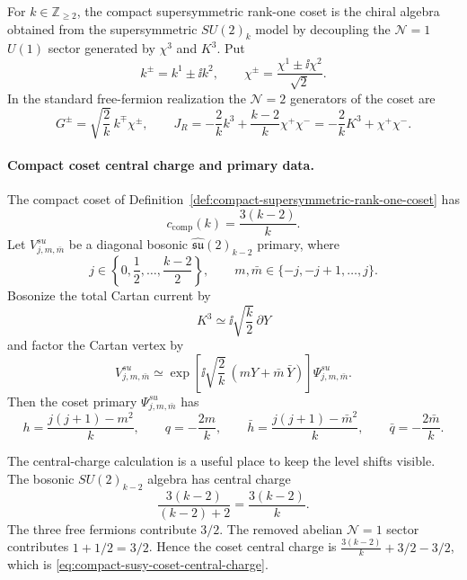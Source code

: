 \begin{definition}
\label{def:compact-supersymmetric-rank-one-coset}
For \(k\in\mathbb Z_{\ge2}\), the compact supersymmetric rank-one coset is
the chiral algebra obtained from the supersymmetric \(SU(2)_k\) model by
decoupling the \(\mathcal N=1\) \(U(1)\) sector generated by
\(\chi^3\) and \(K^3\).  Put
\[
  k^\pm=k^1\pm\ii k^2,
  \qquad
  \chi^\pm=\frac{\chi^1\pm\ii\chi^2}{\sqrt2}.
\]
In the standard free-fermion realization the \(\mathcal N=2\) generators of
the coset are
\begin{equation}
  G^\pm
  =
  \sqrt{\frac2k}\,k^\mp\chi^\pm,
  \qquad
  J_R
  =
  -\frac2k k^3+\frac{k-2}{k}\chi^+\chi^-
  =
  -\frac2k K^3+\chi^+\chi^- .
  \label{eq:compact-susy-coset-n2-generators}
\end{equation}
\end{definition}

\paragraph{Compact coset central charge and primary data.}
The compact coset of
Definition~\ref{def:compact-supersymmetric-rank-one-coset} has
\begin{equation}
  c_{\mathrm{comp}}(k)=\frac{3(k-2)}{k}.
  \label{eq:compact-susy-coset-central-charge}
\end{equation}
Let \(V^{su}_{j,m,\bar m}\) be a diagonal bosonic
\(\widehat{\mathfrak{su}}(2)_{k-2}\) primary, where
\[
  j\in\left\{0,\frac12,\ldots,\frac{k-2}{2}\right\},
  \qquad
  m,\bar m\in\{-j,-j+1,\ldots,j\}.
\]
Bosonize the total Cartan current by
\[
  K^3\simeq \ii\sqrt{\frac k2}\,\partial Y
\]
and factor the Cartan vertex by
\begin{equation}
  V^{su}_{j,m,\bar m}
  \simeq
  \exp\left[
    \ii\sqrt{\frac2k}\,(mY+\bar m\,\bar Y)
  \right]
  \Psi^{su}_{j,m,\bar m}.
  \label{eq:compact-susy-coset-factorization}
\end{equation}
Then the coset primary \(\Psi^{su}_{j,m,\bar m}\) has
\begin{equation}
  h=\frac{j(j+1)-m^2}{k},
  \qquad
  q=-\frac{2m}{k},
  \qquad
  \bar h=\frac{j(j+1)-\bar m^2}{k},
  \qquad
  \bar q=-\frac{2\bar m}{k}.
  \label{eq:compact-susy-coset-unflowed-hq}
\end{equation}

The central-charge calculation is a useful place to keep the level shifts
visible.  The bosonic \(SU(2)_{k-2}\) algebra has central charge
\[
  \frac{3(k-2)}{(k-2)+2}=\frac{3(k-2)}{k}.
\]
The three free fermions contribute \(3/2\).  The removed abelian
\(\mathcal N=1\) sector contributes \(1+1/2=3/2\).  Hence the coset central
charge is \(\frac{3(k-2)}{k}+3/2-3/2\), which is
\eqref{eq:compact-susy-coset-central-charge}.

